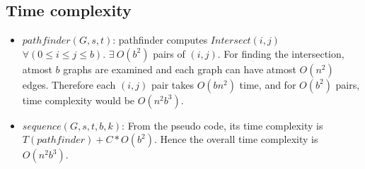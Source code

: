\documentclass[pdftex,a4paper,12pt]{report}
\begin{document}
\subsection{Time complexity}
\begin{itemize}
\item $pathfinder(G,s,t)$: pathfinder computes $Intersect(i,j)$ $\forall (0 \leq i \leq j \leq b)$. $\exists\ O(b^2)$ pairs of $(i,j)$. For finding the intersection, atmost $b$ graphs are examined and each graph can have atmost $O(n^2)$ edges. Therefore each $(i,j)$ pair takes $O(bn^2)$ time, and for $O(b^2)$ pairs, time complexity would be $O(n^2b^3)$.
\item $sequence(G,s,t,b,k)$: From the pseudo code, its time complexity is $T(pathfinder)+C*O(b^2)$. Hence the overall time complexity is $O(n^2b^3)$.
\end{itemize}
\end{document}
